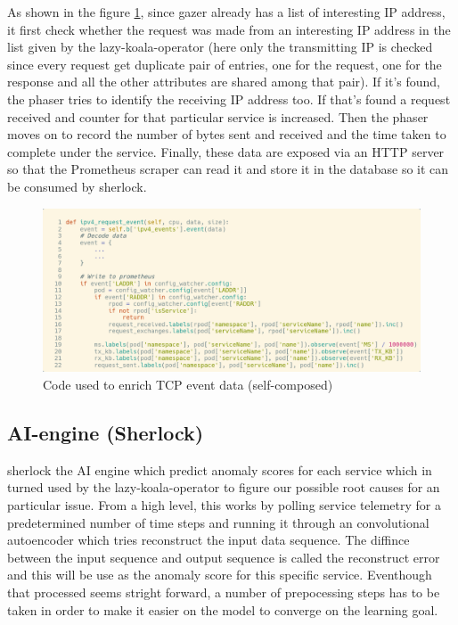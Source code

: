 As shown in the figure \ref{fig:gazer-enrich}, since \ac{gazer} already has a list of interesting IP address, it first check whether the request was made from an interesting IP address in the list given by the \ac{lazy-koala-operator} (here only the transmitting IP is checked since every request get duplicate pair of entries, one for the request, one for the response and all the other attributes are shared among that pair). If it's found, the phaser tries to identify the receiving IP address too. If that's found a request received and counter for that particular service is increased. Then the phaser moves on to record the number of bytes sent and received and the time taken to complete under the service. Finally, these data are exposed via an HTTP server so that the Prometheus scraper can read it and store it in the database so it can be consumed by \ac{sherlock}.

\begin{figure}[H]
    \includegraphics[width=14cm]{assets/implementation/gazer-enrich.png}
    \caption{Code used to enrich TCP event data (self-composed)}
    \label{fig:gazer-enrich}
\end{figure}


\subsection{AI-engine (Sherlock)}

\ac{sherlock} the AI engine which predict anomaly scores for each service which in turned used by the \ac{lazy-koala-operator} to figure our possible root causes for an particular issue. From a high level, this works by polling service telemetry for a predetermined number of time steps and running it through an convolutional autoencoder which tries reconstruct the input data sequence. The diffince between the input sequence and output sequence is called the reconstruct error and this will be use as the anomaly score for this specific service. Eventhough that processed seems stright forward, a number of prepocessing steps has to be taken in order to make it easier on the model to converge on the learning goal.


